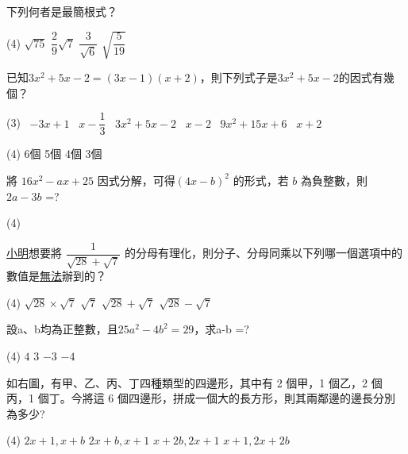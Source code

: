 \documentclass
[answers]
{exam}
\theoremstyle{definition}
\newif\ifyr\yrfalse %
\newcommand{\yr}[1]{\ifyr\relax\else #1\fi}
\newif\ifsho\shofalse %
\newcommand{\sho}[1]{\ifsho\relax\else\rightline{【#1】}\fi}
\begin{document}
\begin{questions}


\question
下列何者是最簡根式？

\begin{tasks}(4)
	\task $\sqrt{75}$
	\task $\dfrac{2}{9}\sqrt{7}$
	\task $\dfrac{3}{\sqrt{6}}$
	\task $\sqrt{\dfrac{5}{19}}$
\end{tasks}




\question
已知$3x^2 + 5x -2 =(3x-1)(x+2)$，則下列式子是$3x^2+5x-2$的因式有幾個？

\begin{tasks}(3)
	\task[(甲)] \ $-3x+1$
	\task[(乙)] \ $x-\dfrac{1}{3}$
	\task[(丙)] \ $3x^2+5x-2$
	\task[(丁)] \ $x-2$
	\task[(戊)] \ $9x^2+15x+6$
	\task[(己)] \ $x+2$
\end{tasks}


\begin{tasks}(4)
	\task 6個
	\task 5個
	\task 4個
	\task 3個
\end{tasks}

\question
將 $16x^2-ax+25$ 因式分解，可得$(4x-b)^2$ 的形式，若 $b$ 為負整數，則 $2a-3b$ =?

\begin{tasks}(4)
\end{tasks}

\question
\underline{小明}想要將 $\dfrac{1}{\sqrt{28}+\sqrt{7}}$ 的分母有理化，則分子、分母同乘以下列哪一個選項中的數值是\underline{無法}辦到的？

\begin{tasks}(4)
	\task $\sqrt{28}\times\sqrt{7}$
	\task $\sqrt{7}$
	\task $\sqrt{28}+\sqrt{7}$
	\task $\sqrt{28}-\sqrt{7}$
\end{tasks}


\question
設a、b均為正整數，且$25a^2-4b^2=29$，求a-b =?

\begin{tasks}(4)
	\task $4$
	\task $3$
	\task $-3$
	\task $-4$
\end{tasks}

\question
如右圖，有甲、乙、丙、丁四種類型的四邊形，其中有 2 個甲，1 個乙，2 個 丙，1 個丁。今將這 6 個四邊形，拼成一個大的長方形，則其兩鄰邊的邊長分別 為多少?
\begin{tasks}(4)
	\task $2x+1,x+b$
	\task $2x+b,x+1$
	\task $x+2b,2x+1$
	\task $x+1,2x+2b$
\end{tasks}



\end{questions}
\end{document}

